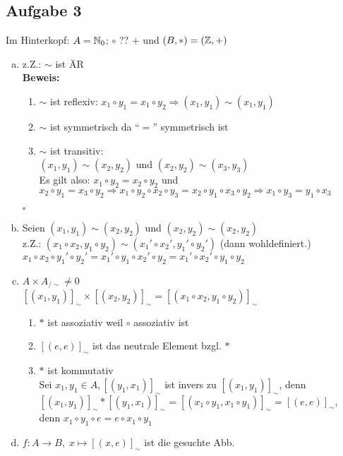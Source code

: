 \documentclass[a4paper,twoside,DIV15,BCOR12mm]{scrbook}
\newcommand{\enue}{\ \begin{enumerate}[(1)]}
\newcommand{\enua}{\ \begin{enumerate}[a)]}
\newcommand{\une}{\end{enumerate}}
\newcommand{\RA}{\Rightarrow}
\newenvironment{bew}{\pagebreak[2]\textbf{Beweis: }}{\qed}
\renewcommand{\qed}{\hspace*{\fill} \ensuremath{\square}}
\begin{document}
\subsection {Aufgabe 3}
Im Hinterkopf: $A=\mathbb{N}_0$; $\circ$ ?? $+$ und $(B,\ast)=(\mathbb{Z},+)$
\enua
\item
z.Z.: $\sim$ ist ÄR\\
\begin{bew}
\enue
  \item $\sim$ ist reflexiv: $x_1\circ y_1=x_1\circ y_2 \RA (x_1,y_1)\sim(x_1,y_1)$
  \item $\sim$ ist symmetrisch da "`$=$"' symmetrisch ist
  \item $\sim$ ist transitiv:\\ $(x_1,y_1)\sim(x_2,y_2)$ und $(x_2,y_2)\sim(x_3,y_3)$\\
  Es gilt also: $x_1\circ y_2 = x_2 \circ y_2$ und $x_2 \circ y_1 = x_3 \circ y_2
  \RA x_1\circ y_2\circ x_2\circ y_3=x_2\circ y_1\circ x_3\circ y_2 \RA x_1\circ y_3=y_1\circ x_3$
\une
\end{bew}

\item
  Seien $(x_1,y_1)\sim(x_2,y_2)$ und $(x_2,y_2)\sim(x_2,y_2)$\\
  z.Z.: $(x_1\circ x_2, y_1\circ y_2)\sim(x_1'\circ x_2', y_1'\circ y_2')$ (dann wohldefiniert.)\\
  $x_1\circ x_2\circ y_1'\circ y_2'=x_1'\circ y_1\circ x_2'\circ y_2=x_1'\circ x_2'\circ y_1\circ y_2$

\item
$A\times A_{/\sim}\neq0$\\
$[(x_1,y_1)]_\sim\times[(x_2,y_2)]_\sim=[(x_1\circ x_2,y_1\circ y_2)]_\sim$
\enue
  \item $\ast$ ist assoziativ weil $\circ$ assoziativ ist
  \item $[(e,e)]_\sim$ ist das neutrale Element bzgl. $\ast$
  \item $\ast$ ist kommutativ\\
  Sei $x_1,y_1 \in A, [(y_1,x_1)]_\sim$ ist invers zu $[(x_1,y_1)]_\sim$, denn\\ $[(x_1,y_1)]_\sim\ast[(y_1,x_1)]_\sim=[(x_1\circ y_1,x_1\circ y_1)]_\sim=[(e,e)]_\sim$, denn $x_1\circ y_1\circ e=e\circ x_1\circ y_1$
\une

\item
  $f: A\to B,\; x \mapsto [(x,e)]_\sim$ ist die gesuchte Abb.
\une
\end{document}
